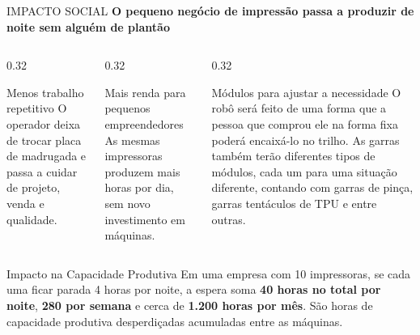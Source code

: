 \documentclass[aspectratio=169, 10pt]{beamer}
\newcommand{\currentpresenter}{Rodrigo}
\newcommand{\setpresenter}[1]{\renewcommand{\currentpresenter}{#1}}
\begin{document}
	\setpresenter{João}
	\begin{frame}{IMPACTO SOCIAL}
		\textbf{\normalsize O pequeno negócio de impressão passa a produzir de noite sem alguém de plantão}
		\vspace{0.18cm}
		
		\begin{columns}[T]
			\begin{column}{0.32\textwidth}
				\begin{block}{Menos trabalho repetitivo}
					\scriptsize O operador deixa de trocar placa de madrugada e passa a cuidar de projeto, venda e qualidade.
				\end{block}
			\end{column}
			
			\begin{column}{0.32\textwidth}
				\begin{block}{Mais renda para pequenos empreendedores}
					\scriptsize As mesmas impressoras produzem mais horas por dia, sem novo investimento em máquinas.
				\end{block}
			\end{column}
			
			\begin{column}{0.32\textwidth}
				\begin{block}{Módulos para ajustar a necessidade}
					\scriptsize O robô será feito de uma forma que a pessoa que comprou ele na forma fixa poderá encaixá-lo no trilho. As garras também terão diferentes tipos de módulos, cada um para uma situação diferente, contando com garras de pinça, garras tentáculos de TPU e entre outras.
				\end{block}
			\end{column}
		\end{columns}
		
		\vspace{0.25cm}
		\begin{alertblock}{Impacto na Capacidade Produtiva}
			\scriptsize Em uma empresa com 10 impressoras, se cada uma ficar parada 4 horas por noite, a espera soma \textbf{40 horas no total por noite}, \textbf{280 por semana} e cerca de \textbf{1.200 horas por mês}. São horas de capacidade produtiva desperdiçadas acumuladas entre as máquinas.
		\end{alertblock}
	\end{frame}
	
\end{document}

